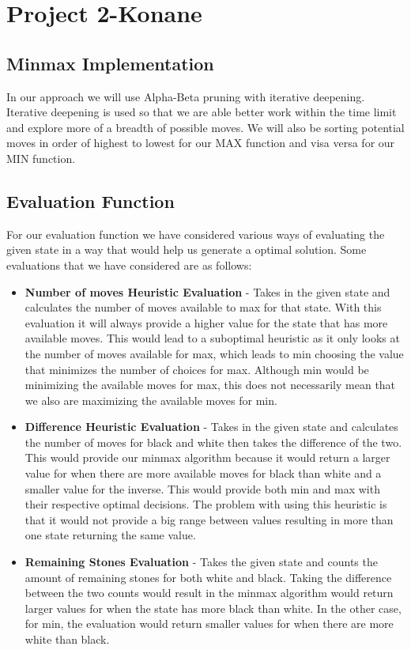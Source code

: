 \documentclass[12pt]{article}
\begin{document}
\section*{Project 2-Konane}

\subsection*{Minmax Implementation}
In our approach we will use Alpha-Beta pruning with iterative deepening.
Iterative deepening is used so that we are able better work within the time limit and explore more of a breadth of possible moves.
We will also be sorting potential moves in order of highest to lowest for our MAX function and visa versa for our MIN function.

\subsection*{Evaluation Function}
For our evaluation function we have considered various ways of evaluating the given state in a way that would help us generate a optimal solution.
Some evaluations that we have considered are as follows:

\begin{itemize}
\item \textbf{Number of moves Heuristic Evaluation} - 
Takes in the given state and calculates the number of moves available to max for that state. 
With this evaluation it will always provide a higher value for the state that has more available moves. 
This would lead to a suboptimal heuristic as it only looks at the number of moves available for max, which leads to min choosing the value that minimizes the number of choices for max. 
Although min would be minimizing the available moves for max, this does not necessarily mean that we also are maximizing the available moves for min.

\item \textbf{Difference Heuristic Evaluation} -
Takes in the given state and calculates the number of moves for black and white then takes the difference of the two. 
This would provide our minmax algorithm because it would return a larger value for when there are more available moves for black than white and a smaller value for the inverse.
This would provide both min and max with their respective optimal decisions.
The problem with using this heuristic is that it would not provide a big range between values resulting in more than one state returning the same value.

\item \textbf{Remaining Stones Evaluation} -
Takes the given state and counts the amount of remaining stones for both white and black.
Taking the difference between the two counts would result in the minmax algorithm would return larger values for when the state has more black than white.
In the other case, for min, the evaluation would return smaller values for when there are more white than black.


\end{itemize}
\end{document}
